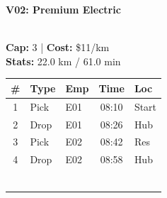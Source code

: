 \documentclass[a4paper,11pt]{article}
\begin{document}
\hfill
\begin{minipage}[t]{0.32\textwidth}
    \centering
    \colorbox{velorablue}{\parbox{\dimexpr\linewidth-2\fboxsep}{\centering \color{white}\textbf{V02: Premium Electric}}} \\
    \vspace{0.05cm}
    {\tiny \textbf{Cap:} 3 | \textbf{Cost:} \$11/km \\ \textbf{Stats:} 22.0 km / 61.0 min}
    \vspace{0.05cm}
    
    \renewcommand{\arraystretch}{0.85}
    \setlength{\tabcolsep}{1pt}
    \tiny
    \begin{tabular}{c l l c l}
        \toprule
        \textbf{\#} & \textbf{Type} & \textbf{Emp} & \textbf{Time} & \textbf{Loc} \\
        \midrule
        1 & Pick & E01 & 08:10 & Start \\
        \rowcolor{headergray} 2 & Drop & E01 & 08:26 & Hub \\
        3 & Pick & E02 & 08:42 & Res \\
        \rowcolor{headergray} 4 & Drop & E02 & 08:58 & Hub \\
        & & & & \\
        & & & & \\
        & & & & \\
        & & & & \\
        & & & & \\
        & & & & \\
        \bottomrule
    \end{tabular}
\end{minipage}
\hfill
\end{document}
